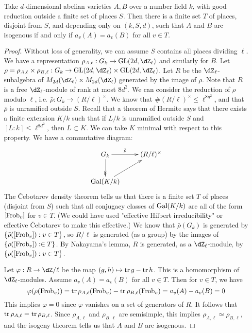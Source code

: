 \begin{lemma}[Faltings]
Take $d$-dimensional abelian varieties $A,B$ over a number field $k$, with good 
reduction outside a finite set of places $S$. Then there is a finite set $T$ of 
places, disjoint from $S$, and depending only on $(k,S,d)$, such that 
$A$ and $B$ are isogenous if and only if $a_v(A)=a_v(B)$ for all $v\in T$. 
\end{lemma}
\begin{proof}
Without loss of generality, we can assume $S$ contains all places dividing 
$\ell$. We have a representation 
$\rho_{A,\ell}:G_k \to \operatorname{GL}(2 d,\dZ_\ell)$ and similarly for 
$B$. Let 
$\rho=\rho_{A,\ell}\times \rho_{B,\ell}:G_k \to \operatorname{GL}(2 d,\dZ_\ell)\times \operatorname{GL}(2 d,\dZ_\ell)$. 
Let $R$ be the $\dZ_\ell$-subalgebra of $M_{2 d}(\dZ_\ell)\times M_{2 d}(\dZ_\ell)$ 
generated by the image of $\rho$. Note that $R$ is a free $\dZ_\ell$-module of 
rank at most $8 d^2$. We can consider the reduction of $\rho$ modulo $\ell$, 
i.e. $\bar\rho:G_k \to (R/\ell)^\times$. We know that 
$\# (R/\ell)^\times \leqslant \ell^{8 g^2}$, and that $\bar\rho$ is unramified 
outside $S$. Recall that a theorem of Hermite says that there exists a finite 
extension $K/k$ such that if $L/k$ is unramified outside $S$ and 
$[L:k]\leqslant \ell^{8 d^2}$, then $L\subset K$. We can take $K$ minimal with 
respect to this property. We have a commutative diagram: 
\[\xymatrix{
  G_k \ar[r]^-{\bar\rho} \ar@{->>}[d] 
    & (R/\ell)^\times \\
  \gal(K/k) \ar[ur]
}\]
The \v Cebotarev density theorem tells us that there is a finite set $T$ of 
places (disjoint from $S$) such that all conjugacy classes of $\operatorname{Gal}(K/k)$ are 
all of the form $[\mathrm{Frob}_v]$ for $v\in T$. 
(We could have used "effective Hilbert irreducibility" or effective 
\v Cebotarev to make this effective.) 
We know that $\bar\rho(G_k)$ is generated by $\{\bar\rho([\mathrm{Frob}_v]):v\in T\}$, 
so $R/\ell$ is generated (as a group) by the images of 
$\{\rho([\mathrm{Frob}_v]):\in T\}$. By Nakayama's lemma, $R$ is generated, as a 
$\dZ_\ell$-module, by $\{\rho([\mathrm{Frob}_v]):v\in T\}$. 

Let $\varphi:R \to \dZ/\ell$ be the map $(g,h)\mapsto \operatorname{tr} g-\operatorname{tr} h$. This 
is a homomorphism of $\dZ_\ell$-modules. Assume $a_v(A)=a_v(B)$ for all 
$v\in T$. Then for $v\in T$, we have 
\[
  \varphi(\rho(\mathrm{Frob}_v)) = \operatorname{tr} \rho_{A,\ell}(\mathrm{Frob}_v) - \operatorname{tr}\rho_{B,\ell}(\mathrm{Frob}_v) = a_v(A)-a_v(B) = 0 
\]
This implies $\varphi=0$ since $\varphi$ vanishes on a set of generators of 
$R$. It follows that $\operatorname{tr} \rho_{A,\ell} = \operatorname{tr}\rho_{B,\ell}$. Since 
$\rho_{A,\ell}$ and $\rho_{B,\ell}$ are semisimple, this implies 
$\rho_{A,\ell}\simeq \rho_{B,\ell}$, and the isogeny theorem tells us that 
$A$ and $B$ are isogenous. 
\end{proof}

